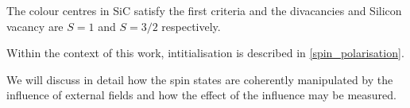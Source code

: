 The colour centres in SiC satisfy the first criteria and the divacancies and Silicon vacancy are $S=1$ and $S=3/2$ respectively. 

Within the context of this work, intitialisation is described in \ref{spin_polarisation}. 

We will discuss in detail how the spin states are coherently manipulated by the influence of external fields and how the effect of the influence may be measured. 
\cite{PhysRevLett.112.087601}



\cite{PhysRevApplied.15.064022}

\cite{PhysRevResearch.2.023394}

\cite{Castelletto2019}

\cite{Zhou2023}

